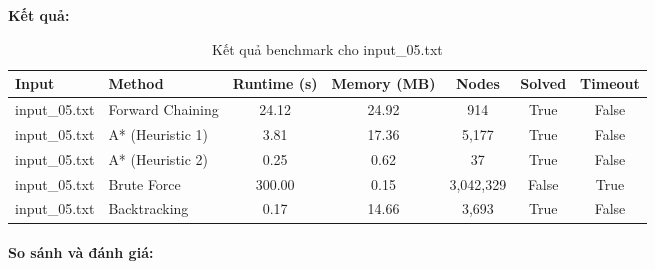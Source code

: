 \textbf{Kết quả:}
\begin{table}[H]
\centering
\begin{tabular}{|l|l|c|c|c|c|c|}
\hline
\textbf{Input} & \textbf{Method} & \textbf{Runtime (s)} & \textbf{Memory (MB)} & \textbf{Nodes} & \textbf{Solved} & \textbf{Timeout} \\
\hline
input\_05.txt & Forward Chaining & 24.12 & 24.92 & 914 & True & False \\
input\_05.txt & A* (Heuristic 1) & 3.81 & 17.36 & 5,177 & True & False \\
input\_05.txt & A* (Heuristic 2) & 0.25 & 0.62 & 37 & True & False \\
input\_05.txt & Brute Force & 300.00 & 0.15 & 3,042,329 & False & True \\
input\_05.txt & Backtracking & 0.17 & 14.66 & 3,693 & True & False \\
\hline
\end{tabular}
\caption{Kết quả benchmark cho input\_05.txt}
\end{table}

\paragraph{So sánh và đánh giá:}

